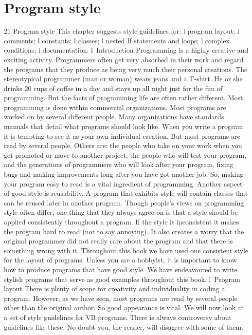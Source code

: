 \chapter{Program style}

21
Program style
This chapter suggests style guidelines for:
l	program layout;
l	comments;
l	constants;
l	classes;
l	nested If statements and loops;
l	complex conditions;
l	documentation.
l Introduction
Programming is a highly creative and exciting activity. Programmers often get very absorbed in their work and regard the programs that they produce as being very much their personal creations. The stereotypical programmer (man or woman) wears jeans and a T-shirt. He or she drinks 20 cups of coffee in a day and stays up all night just for the fun of programming.
But the facts of programming life are often rather different. Most programming is done within commercial organizations. Most programs are worked on by several different people. Many organizations have standards manuals that detail what programs should look like.
When you write a program it is tempting to see it as your own individual creation. But most programs are read by several people. Others are: the people who take on your work when you get promoted or move to another project, the people who will test your program, and the generations of programmers who will look after your program, ﬁxing bugs and making improvements long after you have got another job. So, making your program easy to read is a vital ingredient of programming.
Another aspect of good style is reusability. A program that exhibits style will contain classes that can be reused later in another program.
Though people’s views on programming style often differ, one thing that they always agree on is that a style should be applied consistently throughout a program. If the style is inconsistent it makes the program hard to read (not to say annoying). It also creates a worry that the original programmer did not really care about the program and that there is something wrong with it. Throughout this book we have used one consistent style for the layout of programs.
Unless you are a hobbyist, it is important to know how to produce programs that have good style. We have endeavoured to write stylish programs that serve as good examples throughout this book.
l Program layout
There is plenty of scope for creativity and individuality in coding a program. However, as we have seen, most programs are read by several people other than the original author. So good appearance is vital. We will now look at a set of style guidelines for VB programs. There is always controversy about guidelines like these. No doubt you, the reader, will disagree with some of them.
